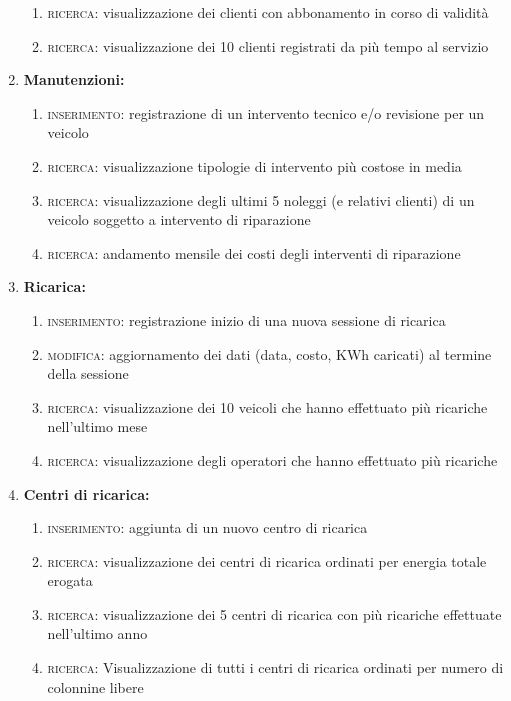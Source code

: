 \documentclass{article}
\begin{document}
\begin{enumerate}
\begin{enumerate}
        \item \textsc{ricerca:} visualizzazione dei clienti con abbonamento in corso di validità
        \item \textsc{ricerca:} visualizzazione dei 10 clienti registrati da più tempo al servizio
    \end{enumerate}
    \item \textbf{Manutenzioni:}
    \begin{enumerate}
        \item \textsc{inserimento:} registrazione di un intervento tecnico e/o revisione per un veicolo
        \item \textsc{ricerca:} visualizzazione tipologie di intervento più costose in media
        \item \textsc{ricerca:} visualizzazione degli ultimi 5 noleggi (e relativi clienti)  di un veicolo soggetto a intervento di riparazione
        \item \textsc{ricerca:} andamento mensile dei costi degli interventi di riparazione
    \end{enumerate}
    \item \textbf{Ricarica:}
    \begin{enumerate}
        \item \textsc{inserimento:} registrazione inizio di una nuova sessione di ricarica
        \item \textsc{modifica:} aggiornamento dei dati (data, costo, KWh caricati) al termine della sessione
        \item \textsc{ricerca:} visualizzazione dei 10 veicoli che hanno effettuato più ricariche nell'ultimo mese
        \item \textsc{ricerca:} visualizzazione degli operatori che hanno effettuato più ricariche
    \end{enumerate}
    \item \textbf{Centri di ricarica:}
    \begin{enumerate}
        \item \textsc{inserimento:} aggiunta di un nuovo centro di ricarica
        \item \textsc{ricerca:} visualizzazione dei centri di ricarica ordinati per energia totale erogata
        \item \textsc{ricerca:} visualizzazione dei 5 centri di ricarica con più ricariche effettuate nell'ultimo anno    
        \item \textsc{ricerca:} Visualizzazione di tutti i centri di ricarica ordinati per numero di colonnine libere

\end{enumerate}
\end{enumerate}
\end{document}
